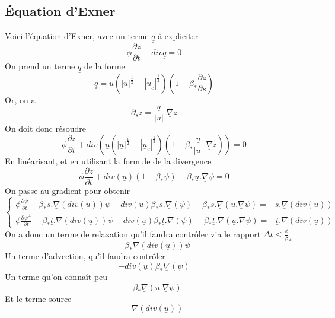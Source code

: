 \documentclass[a4paper,10pt]{article}
\begin{document}
  \subsection{Équation d'Exner}
  Voici l'équation d'Exner, avec un terme $\underline{q}$ à expliciter
  \begin{equation}\label{eq}
    \phi\frac{\partial z}{\partial t}+div\underline{q}=0
  \end{equation}
  On prend un terme $\underline{q}$ de la forme
  \begin{equation}
    \underline{q}=\underline{u}(|\underline{u}|^{\frac{1}{2}}-|\underline{u}_c|^{\frac{1}{2}})(1-\beta_*\frac{\partial z}{\partial s})
  \end{equation}
  Or, on a 
  \[\partial_sz=\frac{\underline{u}}{|\underline{u}|}.\underline\nabla z\]
  On doit donc résoudre
  \[\phi\frac{\partial z}{\partial t}+div(\underline{u}(|\underline{u}|^{\frac{1}{2}}-|\underline{u}_c|^{\frac{1}{2}})(1-\beta_*\frac{\underline{u}}{|\underline{u}|}.\underline\nabla z))=0\]
  En linéarisant, et en utilisant la formule de la divergence
  \[\phi\frac{\partial z}{\partial t}+div(\underline{u})(1-\beta_*\psi)-\beta_*\underline{u}.\underline{\nabla}\psi=0\]
  On passe au gradient pour obtenir
  \[\left\{\begin{array}{l}
      \phi\frac{\partial \psi}{\partial t}-\beta_*\underline{s}.\underline{\nabla}(div(\underline{u}))\psi-div(\underline{u})\beta_*\underline{s}.\underline\nabla(\psi)-\beta_*\underline{s}.\underline{\nabla}(\underline{u}.\underline{\nabla}\psi)=-\underline{s}.\underline{\nabla}(div(\underline{u}))\\
      \phi\frac{\partial \psi^\perp}{\partial t}-\beta_*\underline{t}.\underline{\nabla}(div(\underline{u}))\psi-div(\underline{u})\beta_*\underline{t}.\underline\nabla(\psi)-\beta_*\underline{t}.\underline{\nabla}(\underline{u}.\underline{\nabla}\psi)=-\underline{t}.\underline{\nabla}(div(\underline{u}))
    \end{array}\right.
  \]
  On a donc un terme de relaxation qu'il faudra contrôler via le rapport $\Delta t\leq\frac\phi\beta_*$
  \[-\beta_*\underline{\nabla}(div(\underline{u}))\psi\]
  Un terme d'advection, qu'il faudra contrôler
  \[-div(\underline{u})\beta_*\underline\nabla(\psi)\]
  Un terme qu'on connaît peu
  \[-\beta_*\underline{\nabla}(\underline{u}.\underline{\nabla}\psi)\]
  Et le terme source
  \[-\underline{\nabla}(div(\underline{u}))\]
\end{document}
